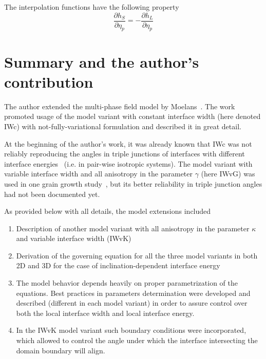 The interpolation functions have the following property
\begin{equation}
	\frac{\partial h_S}{\partial \eta_p} = -\frac{\partial h_L}{\partial \eta_p}
\end{equation}






\section{Summary and the author's contribution}
The author extended the multi-phase field model by Moelans~\cite{Moelans2008}. The work~\cite{Moelans2008} promoted usage of the model variant with constant interface width (here denoted IWc) with not-fully-variational formulation and described it in great detail.

At the beginning of the author's work, it was already known that IWc was not reliably reproducing the angles in triple junctions of interfaces with different interface energies~\cite{Moelans2010_thinfilm} (i.e. in pair-wise isotropic systems). The model variant with variable interface width and all anisotropy in the parameter $\gamma$ (here IWvG) was used in one grain growth study~\cite{Ravash2017}, but its better reliability in triple junction angles had not been documented yet.

As provided below with all details, the model extensions included
\begin{enumerate}
	\item Description of another model variant with all anisotropy in the parameter $\kappa$ and variable interface width (IWvK)
	\item Derivation of the governing equation for all the three model variants in both 2D and 3D for the case of inclination-dependent interface energy
	\item The model behavior depends heavily on proper parametrization of the equations. Best practices in parameters determination were  developed and described (different in each model variant) in order to assure control over both the local interface width and local interface energy. 
	\item In the IWvK model variant such boundary conditions were incorporated, which allowed to control the angle under which the interface intersecting the domain boundary will align.
\end{enumerate}

